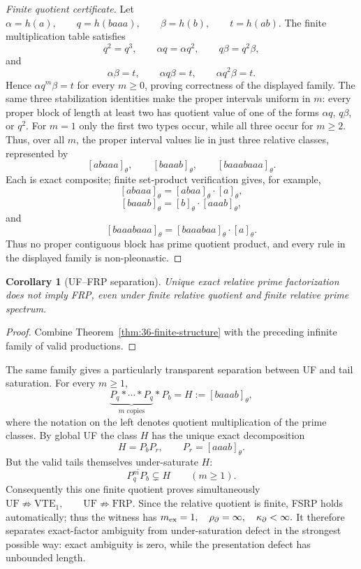 \documentclass[11pt,a4paper]{article}
\newtheorem{corollary}[theorem]{Corollary}
\begin{document}
\begin{proof}[Finite quotient certificate]
Let
\(\alpha=h(a),\qquad q=h(baaa),\qquad \beta=h(b),\qquad t=h(ab).\)
The finite multiplication table satisfies
\[
  q^2=q^3,
  \qquad
  \alpha q=\alpha q^2,
  \qquad
  q\beta=q^2\beta,
\]
and
\[
  \alpha\beta=t,
  \qquad
  \alpha q\beta=t,
  \qquad
  \alpha q^2\beta=t.
\]
Hence $\alpha q^m\beta=t$ for every $m\ge0$, proving correctness of the displayed family.  The same three stabilization identities make the proper intervals uniform in $m$: every proper block of length at least two has quotient value of one of the forms $\alpha q$, $q\beta$, or $q^2$.  For $m=1$ only the first two types occur, while all three occur for $m\ge2$.  Thus, over all $m$, the proper interval values lie in just three relative classes, represented by
\[
  [abaaa]_\theta,
  \qquad
  [baaab]_\theta,
  \qquad
  [baaabaaa]_\theta.
\]
Each is exact composite; finite set-product verification gives, for example,
\[
  [abaaa]_\theta=[abaa]_\theta\cdot[a]_\theta,
\]
\[
  [baaab]_\theta=[b]_\theta\cdot[aaab]_\theta,
\]
and
\[
  [baaabaaa]_\theta=[baaabaa]_\theta\cdot[a]_\theta.
\]
Thus no proper contiguous block has prime quotient product, and every rule in the displayed family is non-pleonastic.
\end{proof}

\begin{corollary}[UF--FRP separation]
\label{cor:uf-frp-separation}
Unique exact relative prime factorization does not imply FRP, even under finite relative quotient and finite relative prime spectrum.
\end{corollary}

\begin{proof}
Combine Theorem~\ref{thm:36-finite-structure} with the preceding infinite family of valid productions.
\end{proof}

The same family gives a particularly transparent separation between UF and tail saturation.  For every $m\ge1$,
\[
  \underbrace{P_q*\cdots*P_q}_{m\text{ copies}}*P_b
  =H:=[baaab]_\theta,
\]
where the notation on the left denotes quotient multiplication of the prime classes.  By global UF the class $H$ has the unique exact decomposition
\[
  \boxed{
  H=P_bP_r,
  \qquad P_r=[aaab]_\theta.
  }
\]
But the valid tails themselves under-saturate $H$:
\[
  \boxed{
  \overline{P_q^mP_b}\subsetneq H
  \qquad(m\ge1).
  }
\]
Consequently this one finite quotient proves simultaneously
\(\mathrm{UF}\not\Rightarrow\mathrm{VTE}_1, \qquad \mathrm{UF}\not\Rightarrow\mathrm{FRP}.\)
Since the relative quotient is finite, FSRP holds automatically; thus the witness has
\(m_{\rm ex}=1,\quad \rho_\partial=\infty,\quad \kappa_\partial<\infty.\)
It therefore separates exact-factor ambiguity from under-saturation defect in the strongest possible way: exact ambiguity is zero, while the presentation defect has unbounded length.
\end{document}
